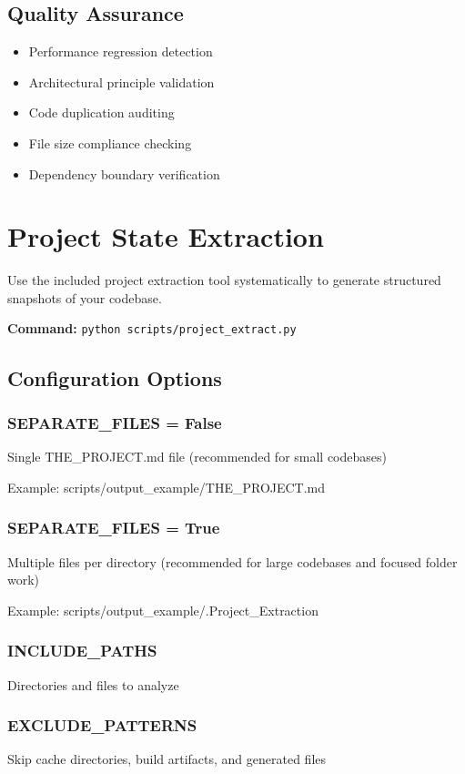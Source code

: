 \documentclass{article}
\begin{document}
\subsection{Quality Assurance}
\begin{itemize}[noitemsep]
\item Performance regression detection
\item Architectural principle validation
\item Code duplication auditing
\item File size compliance checking
\item Dependency boundary verification
\end{itemize}

\section{Project State Extraction}
Use the included project extraction tool systematically to generate structured snapshots of your codebase.

\textbf{Command:} \texttt{python scripts/project\_extract.py}

\subsection{Configuration Options}

\subsubsection{SEPARATE\_FILES = False}
Single THE\_PROJECT.md file (recommended for small codebases)

Example: scripts/output\_example/THE\_PROJECT.md

\subsubsection{SEPARATE\_FILES = True}
Multiple files per directory (recommended for large codebases and focused folder work)

Example: scripts/output\_example/.Project\_Extraction

\subsubsection{INCLUDE\_PATHS}
Directories and files to analyze

\subsubsection{EXCLUDE\_PATTERNS}
Skip cache directories, build artifacts, and generated files
\end{document}
